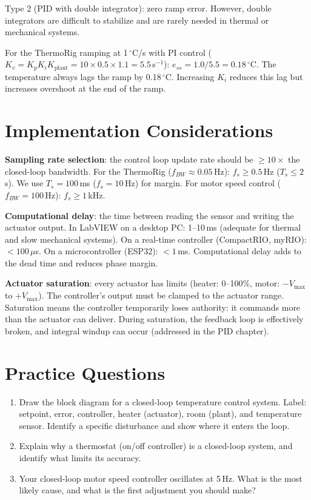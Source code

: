 \documentclass[11pt,letterpaper,twoside,openany]{book}
\newcommand{\degC}{\ensuremath{{}^{\circ}\text{C}}}
\begin{document}
Type 2 (PID with double integrator): zero ramp error. However, double integrators are difficult to stabilize and are rarely needed in thermal or mechanical systems.

For the ThermoRig ramping at 1\,\degC{}/s with PI control ($K_v = K_p K_i K_{\text{plant}} = 10 \times 0.5 \times 1.1 = 5.5$\,s$^{-1}$): $e_{ss} = 1.0/5.5 = 0.18$\,\degC{}. The temperature always lags the ramp by 0.18\,\degC{}. Increasing $K_i$ reduces this lag but increases overshoot at the end of the ramp.

\section{Implementation Considerations}
\textbf{Sampling rate selection}: the control loop update rate should be $\geq 10\times$ the closed-loop bandwidth. For the ThermoRig ($f_{BW} \approx 0.05$\,Hz): $f_s \geq 0.5$\,Hz ($T_s \leq 2$\,s). We use $T_s = 100$\,ms ($f_s = 10$\,Hz) for margin. For motor speed control ($f_{BW} = 100$\,Hz): $f_s \geq 1$\,kHz.

\textbf{Computational delay}: the time between reading the sensor and writing the actuator output. In LabVIEW on a desktop PC: 1--10\,ms (adequate for thermal and slow mechanical systems). On a real-time controller (CompactRIO, myRIO): $< 100\,\mu$s. On a microcontroller (ESP32): $< 1$\,ms. Computational delay adds to the dead time and reduces phase margin.

\textbf{Actuator saturation}: every actuator has limits (heater: 0--100\%, motor: $-V_{\text{max}}$ to $+V_{\text{max}}$). The controller's output must be clamped to the actuator range. Saturation means the controller temporarily loses authority: it commands more than the actuator can deliver. During saturation, the feedback loop is effectively broken, and integral windup can occur (addressed in the PID chapter).
\section{Practice Questions}
\begin{enumerate}[leftmargin=1.5em]
\item Draw the block diagram for a closed-loop temperature control system. Label: setpoint, error, controller, heater (actuator), room (plant), and temperature sensor. Identify a specific disturbance and show where it enters the loop.
\item Explain why a thermostat (on/off controller) is a closed-loop system, and identify what limits its accuracy.
\item Your closed-loop motor speed controller oscillates at 5\,Hz. What is the most likely cause, and what is the first adjustment you should make?
\end{enumerate}
\end{document}
